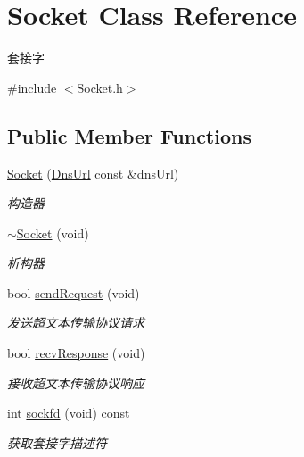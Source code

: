 \hypertarget{class_socket}{}\section{Socket Class Reference}
\label{class_socket}


套接字  




{\ttfamily \#include $<$Socket.\+h$>$}

\subsection*{Public Member Functions}
\begin{DoxyCompactItemize}
\item 
\hyperlink{class_socket_a57f6077d6f5db44a5eb8624463ed99e4}{Socket} (\hyperlink{class_dns_url}{Dns\+Url} const \&dns\+Url)
\begin{DoxyCompactList}\small\item\em 构造器 \end{DoxyCompactList}\item 
\mbox{\label{class_socket_a763aae809efa471def8e7918281c3a1c}} 
\hyperlink{class_socket_a763aae809efa471def8e7918281c3a1c}{$\sim$\+Socket} (void)
\begin{DoxyCompactList}\small\item\em 析构器 \end{DoxyCompactList}\item 
bool \hyperlink{class_socket_acfc00252e4e40f68442a4b28fc5b32b3}{send\+Request} (void)
\begin{DoxyCompactList}\small\item\em 发送超文本传输协议请求 \end{DoxyCompactList}\item 
bool \hyperlink{class_socket_aa935a43a54d0ac03505b2ab32c095b99}{recv\+Response} (void)
\begin{DoxyCompactList}\small\item\em 接收超文本传输协议响应 \end{DoxyCompactList}\item 
int \hyperlink{class_socket_a427f1295ef1fce2c69e0b9a093fd0284}{sockfd} (void) const
\begin{DoxyCompactList}\small\item\em 获取套接字描述符 \end{DoxyCompactList}\end{DoxyCompactItemize}


